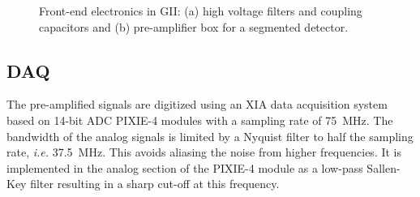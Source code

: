 \begin{figure}[tbhp]
\centering
{}\hfil%
%
\caption{Front-end electronics in GII: (a) high voltage filters and
coupling capacitors and (b) pre-amplifier box for a segmented
detector.}
\label{fig:tt:gef}
\end{figure}

\subsection{DAQ} 
\label{sec:tt:daq}
The pre-amplified signals are digitized using an XIA data acquisition
system \cite{Daq06} based on 14-bit ADC PIXIE-4 modules with a
sampling rate of 75~MHz. The bandwidth of the analog signals is
limited by a Nyquist filter to half the sampling rate, \textit{i.e.}
37.5~MHz. This avoids aliasing the noise from higher frequencies. It
is implemented in the analog section of the PIXIE-4 module as a
low-pass Sallen-Key filter resulting in a sharp cut-off at this
frequency. 

